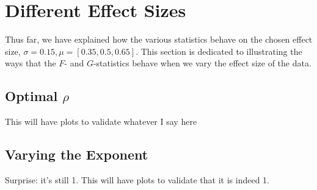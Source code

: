 \section{Different Effect Sizes}\label{sec:EffectSize}
Thus far, we have explained how the various statistics behave on the chosen effect size, $\sigma = 0.15, \mu = [0.35, 0.5, 0.65]$. This section is dedicated to illustrating the ways that the $F$- and $G$-statistics behave when we vary the effect size of the data.
\subsection{Optimal $\rho$}
This will have plots to validate whatever I say here
\subsection{Varying the Exponent}
Surprise: it's still 1.
This will have plots to validate that it is indeed 1.

